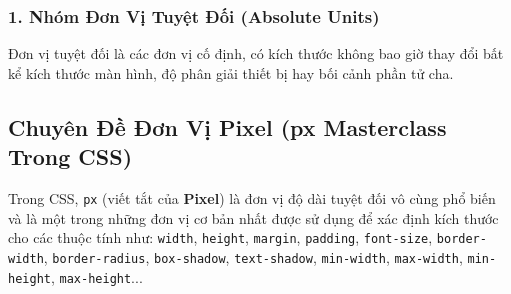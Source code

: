 \documentclass[11pt,oneside]{book}
\newcommand{\thd}[1]{\textcolor{white}{\textbf{\strut #1}}}
\newcommand{\codeinline}[1]{\textcolor{accentOrange}{\texttt{#1}}}
\newcommand{\term}[1]{\textbf{\textcolor{primaryBlue}{#1}}}
\begin{document}
\subsubsection{1. Nhóm Đơn Vị Tuyệt Đối (Absolute Units)}

Đơn vị tuyệt đối là các đơn vị cố định, có kích thước không bao giờ thay đổi bất kể kích thước màn hình, độ phân giải thiết bị hay bối cảnh phần tử cha.

\begin{prettyTableBox}
\sffamily\small
{}
\end{prettyTableBox}

\subsection{Chuyên Đề Đơn Vị Pixel (px Masterclass Trong CSS)}
\label{sec:css_pixel_masterclass}

Trong CSS, \codeinline{px} (viết tắt của \term{Pixel}) là đơn vị độ dài tuyệt đối vô cùng phổ biến và là một trong những đơn vị cơ bản nhất được sử dụng để xác định kích thước cho các thuộc tính như: \codeinline{width}, \codeinline{height}, \codeinline{margin}, \codeinline{padding}, \codeinline{font-size}, \codeinline{border-width}, \codeinline{border-radius}, \codeinline{box-shadow}, \codeinline{text-shadow}, \codeinline{min-width}, \codeinline{max-width}, \codeinline{min-height}, \codeinline{max-height}...
\end{document}
